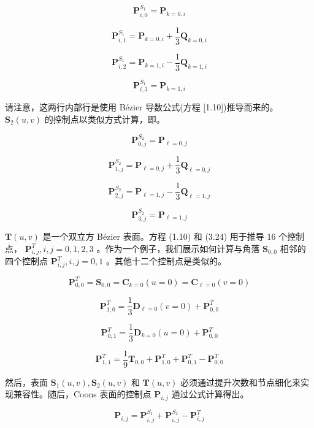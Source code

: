 \documentclass[../main.tex]{subfiles}
\begin{document}
\[
{\mathbf{P}}_{i,0}^{{S}_{1}} = {\mathbf{P}}_{k = 0,i}
\]

\[
{\mathbf{P}}_{i,1}^{{S}_{1}} = {\mathbf{P}}_{k = 0,i} + \frac{1}{3}{\mathbf{Q}}_{k = 0,i}
\]

\[
{\mathbf{P}}_{i,2}^{{S}_{1}} = {\mathbf{P}}_{k = 1,i} - \frac{1}{3}{\mathbf{Q}}_{k = 1,i}
\]

\[
{\mathbf{P}}_{i,3}^{{S}_{1}} = {\mathbf{P}}_{k = 1,i} \tag{10.40}
\]

请注意，这两行内部行是使用 Bézier 导数公式(方程 [1.10])推导而来的。 \({\mathbf{S}}_{2}\left( {u,v}\right)\) 的控制点以类似方式计算，即。

\[
{\mathbf{P}}_{0,j}^{{S}_{2}} = {\mathbf{P}}_{\ell  = 0,j}
\]

\[
{\mathbf{P}}_{1,j}^{{S}_{2}} = {\mathbf{P}}_{\ell  = 0,j} + \frac{1}{3}{\mathbf{Q}}_{\ell  = 0,j}
\]

\[
{\mathbf{P}}_{2,j}^{{S}_{2}} = {\mathbf{P}}_{\ell  = 1,j} - \frac{1}{3}{\mathbf{Q}}_{\ell  = 1,j}
\]

\[
{\mathbf{P}}_{3,j}^{{S}_{2}} = {\mathbf{P}}_{\ell  = 1,j} \tag{10.41}
\]

\(\mathbf{T}\left( {u,v}\right)\) 是一个双立方 Bézier 表面。方程 (1.10) 和 (3.24) 用于推导 16 个控制点， \({\mathbf{P}}_{i,j}^{T},i,j = 0,1,2,3\) 。作为一个例子，我们展示如何计算与角落 \({\mathbf{S}}_{0,0}\) 相邻的四个控制点 \({\mathbf{P}}_{i,j}^{T},i,j = 0,1\) 。其他十二个控制点是类似的。

\[
{\mathbf{P}}_{0,0}^{T} = {\mathbf{S}}_{0,0} = {\mathbf{C}}_{k = 0}\left( {u = 0}\right)  = {\mathbf{C}}_{\ell  = 0}\left( {v = 0}\right)
\]

\[
{\mathbf{P}}_{1,0}^{T} = \frac{1}{3}{\mathbf{D}}_{\ell  = 0}\left( {v = 0}\right)  + {\mathbf{P}}_{0,0}^{T}
\]

\[
{\mathbf{P}}_{0,1}^{T} = \frac{1}{3}{\mathbf{D}}_{k = 0}\left( {u = 0}\right)  + {\mathbf{P}}_{0,0}^{T}
\]

\[
{\mathbf{P}}_{1,1}^{T} = \frac{1}{9}{\mathbf{T}}_{0,0} + {\mathbf{P}}_{1,0}^{T} + {\mathbf{P}}_{0,1}^{T} - {\mathbf{P}}_{0,0}^{T} \tag{10.42}
\]

然后，表面 \({\mathbf{S}}_{1}\left( {u,v}\right) ,{\mathbf{S}}_{2}\left( {u,v}\right)\) 和 \(\mathbf{T}\left( {u,v}\right)\) 必须通过提升次数和节点细化来实现兼容性。随后，Coons 表面的控制点 \({\mathbf{P}}_{i,j}\) 通过公式计算得出。

\[
{\mathbf{P}}_{i,j} = {\mathbf{P}}_{i,j}^{{S}_{1}} + {\mathbf{P}}_{i,j}^{{S}_{2}} - {\mathbf{P}}_{i,j}^{T} \tag{10.43}
\]
\end{document}
